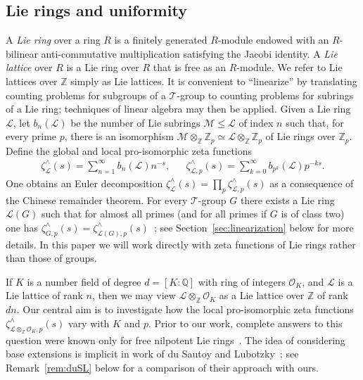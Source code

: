 \documentclass[11pt,a4paper]{amsart}
\theoremstyle{plain}
\theoremstyle{remark}
\newcommand{\Z}{\mathbb{Z}}
\newcommand{\Q}{\mathbb{Q}}
\newcommand{\tensor}{\otimes}
\newcommand{\dimL}{n}
\begin{document}
\subsection{Lie rings and uniformity}
A {\emph{Lie ring}} over a ring $R$ is a finitely generated $R$-module endowed with an $R$-bilinear anti-commutative multiplication satisfying the Jacobi identity.  A {\emph{Lie lattice}} over $R$ is a Lie ring over $R$ that is free as an $R$-module.  We refer to Lie lattices over $\Z$ simply as Lie lattices.  It is convenient to ``linearize'' by translating counting problems for subgroups of a $\mathcal{T}$-group to counting problems for subrings of a Lie ring; techniques of linear algebra may then be applied.  
Given a Lie ring $\mathcal{L}$, let $b_n(\mathcal{L})$ be the number of Lie subrings $\mathcal{M} \leq \mathcal{L}$ of index $n$ such that, for every prime $p$, there is an isomorphism $\mathcal{M} \tensor_\Z \Z_p \simeq \mathcal{L} \tensor_\Z \Z_p$ of Lie rings over $\Z_p$.  Define the global and local pro-isomorphic zeta functions
$$\begin{array}{lcr}
\zeta_{\mathcal{L}}^\wedge (s) = \sum_{n = 1}^\infty b_n (\mathcal{L}) n^{-s}, & &
\zeta^\wedge_{\mathcal{L},p} (s) = \sum_{k = 0}^\infty b_{p^k} (\mathcal{L}) p^{-ks}. \end{array}$$
One obtains an Euler decomposition $\zeta^\wedge_{\mathcal{L}} (s) = \prod_p \zeta^\wedge_{\mathcal{L},p}(s)$ as a consequence of the Chinese remainder theorem.
For every $\mathcal{T}$-group $G$ there exists a Lie ring $\mathcal{L}(G)$ such that for almost all primes (and for all primes if $G$ is of class two) one has 
$\zeta^\wedge_{G,p} (s) = \zeta^\wedge_{\mathcal{L}(G),p} (s)$~\cite[\S4]{GSS/88}; see Section~\ref{sec:linearization} below for more details.  
In this paper we will work directly with zeta functions of Lie rings rather than those of groups.


If $K$ is a number field of degree $d=[K:\Q]$ with ring of integers $\mathcal{O}_K$, and $\mathcal{L}$ is a Lie lattice of rank $\dimL$, then we may view $\mathcal{L} \tensor_\Z \mathcal{O}_K$ as a Lie lattice over $\Z$ of rank $d \dimL$. Our central aim is to investigate how the local pro-isomorphic zeta functions $\zeta^\wedge_{\mathcal{L} \tensor_\Z \mathcal{O}_K, p}(s)$ vary with $K$ and $p$. Prior to our work, complete answers to this question were known only for free nilpotent Lie rings~\cite{GSS/88}.  The idea of considering base extensions is implicit in work of du Sautoy and Lubotzky~\cite{duSLubotzky/96}; see Remark~\ref{rem:duSL} below for a comparison of their approach with ours.
\end{document}
